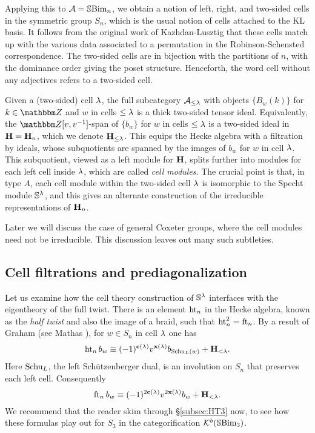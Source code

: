 Applying this to ${\mathcal{A}} = {\mathbb{S}}{\rm Bim }_n$, we obtain a notion of left, right, and two-sided cells in the symmetric group $S_n$, which is the usual notion of cells attached to the KL basis. It
follows from the original work of Kazhdan-Lusztig that these cells match up with the various data associated to a permutation in the Robinson-Schensted correspondence. The two-sided
cells are in bijection with the partitions of $n$, with the dominance order giving the poset structure. Henceforth, the word cell without any adjectives refers to a two-sided cell.

Given a (two-sided) cell $\lambda$, the full subcategory ${\mathcal{A}}_{\le \lambda}$ with objects $\{B_w(k)\}$ for $k \in \Z$ and $w$ in cells $\le \lambda$ is a thick two-sided tensor ideal. Equivalently, the
$\Z[v,v\inv]$-span of $\{b_w\}$ for $w$ in cells $\le \lambda$ is a two-sided ideal in ${\mathbf H} = {\mathbf H}_n$, which we denote ${\mathbf H}_{\le \lambda}$. This equips the Hecke algebra with a filtration by
ideals, whose subquotients are spanned by the images of $b_w$ for $w$ in cell $\lambda$. This subquotient, viewed as a left module for ${\mathbf H}$, splits further into modules for each left cell
inside $\lambda$, which are called \emph{cell modules}. The crucial point is that, in type $A$, each cell module within the two-sided cell $\lambda$ is isomorphic to the Specht module ${\mathbb{S}}^\lambda$,
and this gives an alternate construction of the irreducible representations of ${\mathbf H}_n$.

\begin{remark} Later we will discuss the case of general Coxeter groups, where the cell modules need not be irreducible. This discussion leaves out many such subtleties. \end{remark}
	
\subsection{Cell filtrations and prediagonalization}

Let us examine how the cell theory construction of ${\mathbb{S}}^\lambda$ interfaces with the eigentheory of the full twist. There is an element $\operatorname{ht}_n$ in the Hecke algebra, known as the \emph{half twist} and also the image of a braid, such that $\operatorname{ht}_n^2 = \operatorname{ft}_n$. By a result of Graham (see Mathas \cite{Mathas96}), for $w \in S_n$ in cell $\lambda$ one has
\begin{equation} \label{eq:htactionintro} \operatorname{ht}_n b_w \equiv (-1)^{\mathbf{c}(\lambda)} v^{\mathbf{x}(\lambda)} b_{\operatorname{Schu}_L(w)} + {\mathbf H}_{<\lambda}. \end{equation} 
Here $\operatorname{Schu}_L$, the left Sch\"utzenberger dual, is an involution on $S_n$ that preserves each left cell. Consequently
\begin{equation} \label{eq:ftactionintro} \operatorname{ft}_n b_w \equiv (-1)^{2 \mathbf{c}(\lambda)} v^{2 \mathbf{x}(\lambda)} b_{w} + {\mathbf H}_{<\lambda}. \end{equation}
We recommend that the reader skim through \S\ref{subsec:HT3} now, to see how these formulas play out for $S_3$ in the categorification ${\mathcal{K}}^b({\mathbb{S}}{\rm Bim }_3)$.


